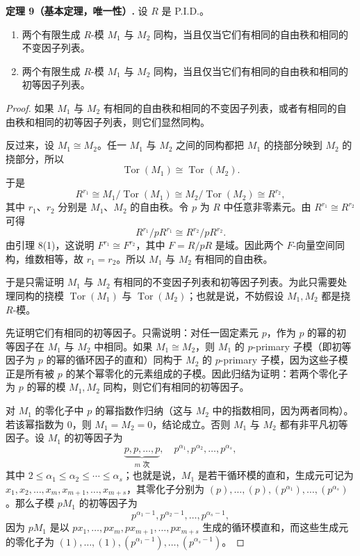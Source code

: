 \noindent\textbf{定理 9（基本定理，唯一性）.} 设 $R$ 是 P.I.D.。
\begin{enumerate}[label=(\arabic*)]
\item 两个有限生成 $R$-模 $M_1$ 与 $M_2$ 同构，当且仅当它们有相同的自由秩和相同的不变因子列表。
\item 两个有限生成 $R$-模 $M_1$ 与 $M_2$ 同构，当且仅当它们有相同的自由秩和相同的初等因子列表。
\end{enumerate}

\begin{proof}
如果 $M_1$ 与 $M_2$ 有相同的自由秩和相同的不变因子列表，或者有相同的自由秩和相同的初等因子列表，则它们显然同构。

反过来，设 $M_1\cong M_2$。任一 $M_1$ 与 $M_2$ 之间的同构都把 $M_1$ 的挠部分映到 $M_2$ 的挠部分，所以
\[
\operatorname{Tor}(M_1)\cong\operatorname{Tor}(M_2).
\]
于是
\[
R^{r_1}\cong M_1/\operatorname{Tor}(M_1)
\cong M_2/\operatorname{Tor}(M_2)\cong R^{r_2},
\]
其中 $r_1$、$r_2$ 分别是 $M_1$、$M_2$ 的自由秩。令 $p$ 为 $R$ 中任意非零素元。由 $R^{r_1}\cong R^{r_2}$ 可得
\[
R^{r_1}/pR^{r_1}\cong R^{r_2}/pR^{r_2}.
\]
由引理 8(1)，这说明 $F^{r_1}\cong F^{r_2}$，其中 $F=R/pR$ 是域。因此两个 $F$-向量空间同构，维数相等，故 $r_1=r_2$。所以 $M_1$ 与 $M_2$ 有相同的自由秩。

于是只需证明 $M_1$ 与 $M_2$ 有相同的不变因子列表和初等因子列表。为此只需要处理同构的挠模 $\operatorname{Tor}(M_1)$ 与 $\operatorname{Tor}(M_2)$；也就是说，不妨假设 $M_1,M_2$ 都是挠 $R$-模。

先证明它们有相同的初等因子。只需说明：对任一固定素元 $p$，作为 $p$ 的幂的初等因子在 $M_1$ 与 $M_2$ 中相同。如果 $M_1\cong M_2$，则 $M_1$ 的 $p$-primary 子模（即初等因子为 $p$ 的幂的循环因子的直和）同构于 $M_2$ 的 $p$-primary 子模，因为这些子模正是所有被 $p$ 的某个幂零化的元素组成的子模。因此归结为证明：若两个零化子为 $p$ 的幂的模 $M_1,M_2$ 同构，则它们有相同的初等因子。

对 $M_1$ 的零化子中 $p$ 的幂指数作归纳（这与 $M_2$ 中的指数相同，因为两者同构）。若该幂指数为 $0$，则 $M_1=M_2=0$，结论成立。否则 $M_1$ 与 $M_2$ 都有非平凡初等因子。设 $M_1$ 的初等因子为
\[
\underbrace{p,p,\ldots,p}_{m\text{ 次}},\quad p^{\alpha_1},p^{\alpha_2},\ldots,p^{\alpha_s},
\]
其中 $2\leq\alpha_1\leq\alpha_2\leq\cdots\leq\alpha_s$；也就是说，$M_1$ 是若干循环模的直和，生成元可记为 $x_1,x_2,\ldots,x_m,x_{m+1},\ldots,x_{m+s}$，其零化子分别为 $(p),\ldots,(p),(p^{\alpha_1}),\ldots,(p^{\alpha_s})$。那么子模 $pM_1$ 的初等因子为
\[
p^{\alpha_1-1},p^{\alpha_2-1},\ldots,p^{\alpha_s-1},
\]
因为 $pM_1$ 是以 $px_1,\ldots,px_m,px_{m+1},\ldots,px_{m+s}$ 生成的循环模直和，而这些生成元的零化子为 $(1),\ldots,(1),(p^{\alpha_1-1}),\ldots,(p^{\alpha_s-1})$。


\end{proof}
